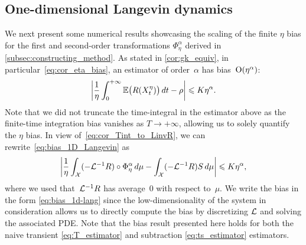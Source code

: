 \subsection{One-dimensional Langevin dynamics}
\label{subsec:num_1D}
%
%
%
We next present some numerical results showcasing the scaling of the finite $\eta$ bias for the first and second-order transformations $\Phi_\eta^\alpha$ derived in \cref{subsec:constructing_method}. As stated in \cref{cor:gk_equiv}, in particular~\eqref{eq:cor_eta_bias}, an estimator of order~$\alpha$ has bias~$\mathrm{O}(\eta^\alpha)$: 
%
\begin{equation}
\label{eq:bias_1D_Langevin}
	\abs*{\frac{1}{\eta}\int_0^{+\infty} \E\bigl(R(X^\eta_t)\bigr) \, dt - \rho} \leq K \eta^{\alpha}.
\end{equation}
%
Note that we did not truncate the time-integral in the estimator above as the finite-time integration bias vanishes as $T\to+\infty$, allowing us to solely quantify the $\eta$ bias. In view of~\eqref{eq:cor_Tint_to_LinvR}, we can rewrite~\eqref{eq:bias_1D_Langevin} as
%
\begin{equation}
    \abs*{\frac{1}{\eta}\int_\mathcal{X} (-\L^{-1}R) \circ \Phi_\eta^\alpha \, d\mu - \int_\mathcal{X} (-\L^{-1}R) S \, d\mu} \leq K\eta^{\alpha},
    \label{eq:bias_1d-lang}
\end{equation}
%
where we used that~$\mathcal{L}^{-1}R$ has average~0 with respect to~$\mu$. We write the bias in the form \eqref{eq:bias_1d-lang} since the low-dimensionality of the system in consideration allows us to directly compute the bias by discretizing $\mathcal{L}$ and solving the associated PDE. %
Note that the bias result presented here holds for both the naive transient \eqref{eq:T_estimator} and subtraction \eqref{eq:ts_estimator} estimators.

